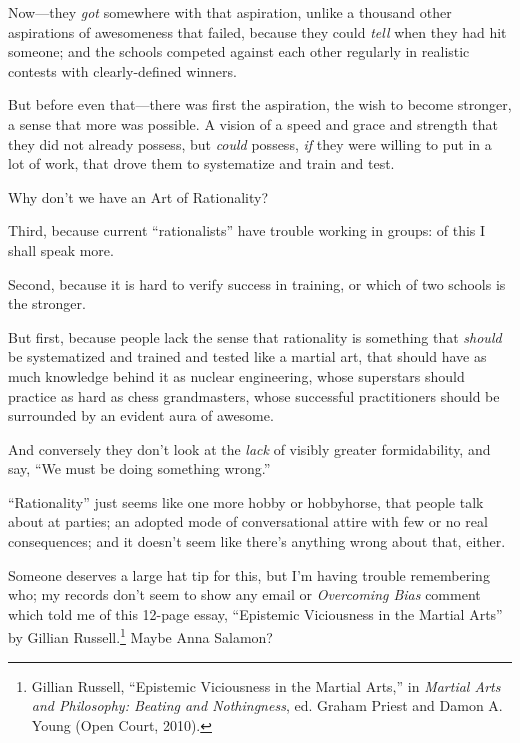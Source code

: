 {
 Now---they \textit{got} somewhere with that aspiration, unlike a
thousand other aspirations of awesomeness that failed, because they
could \textit{tell} when they had hit someone; and the schools competed
against each other regularly in realistic contests with clearly-defined
winners.}

{
 But before even that---there was first the aspiration, the wish to
become stronger, a sense that more was possible. A vision of a speed
and grace and strength that they did not already possess, but
\textit{could} possess, \textit{if} they were willing to put in a lot
of work, that drove them to systematize and train and test.}

{
 Why don't we have an Art of Rationality?}

{
 Third, because current
``rationalists'' have trouble
working in groups: of this I shall speak more.}

{
 Second, because it is hard to verify success in training, or which
of two schools is the stronger.}

{
 But first, because people lack the sense that rationality is
something that \textit{should} be systematized and trained and tested
like a martial art, that should have as much knowledge behind it as
nuclear engineering, whose superstars should practice as hard as chess
grandmasters, whose successful practitioners should be surrounded by an
evident aura of awesome.}

{
 And conversely they don't look at the
\textit{lack} of visibly greater formidability, and say,
``We must be doing something
wrong.''}

{
 ``Rationality'' just seems like
one more hobby or hobbyhorse, that people talk about at parties; an
adopted mode of conversational attire with few or no real consequences;
and it doesn't seem like there's
anything wrong about that, either.}

\myendsectiontext


{
 Someone deserves a large hat tip for this, but I'm
having trouble remembering who; my records don't seem
to show any email or \textit{Overcoming Bias} comment which told me of
this 12-page essay, ``Epistemic Viciousness in the
Martial Arts'' by Gillian Russell.\footnote{Gillian Russell, ``Epistemic Viciousness in
the Martial Arts,'' in \textit{Martial Arts and
Philosophy: Beating and Nothingness}, ed. Graham Priest and Damon A.
Young (Open Court, 2010).}
Maybe Anna Salamon?}

